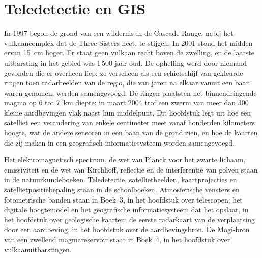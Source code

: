 \chapter{Teledetectie en GIS}\label{ch:b3:remote-sensing-gis}

In 1997 begon de grond van een wildernis in de Cascade Range, nabij het
vulkaancomplex dat de Three Sisters heet, te stijgen. In 2001 stond het midden ervan
\qty{15}{cm} hoger. Er staat geen vulkaan recht boven de zwelling, en de
laatste uitbarsting in het gebied was 1\,500 jaar oud. De opheffing werd door niemand
gevonden die er overheen liep: ze verscheen als een schietschijf van gekleurde ringen
toen radarbeelden van de regio, die van jaren na elkaar vanuit een baan waren genomen,
werden samengevoegd. De ringen plaatsten het binnendringende magma op 6 tot
\qty{7}{km} diepte; in maart 2004 trof een zwerm van meer dan 300 kleine aardbevingen
vlak naast hun middelpunt. Dit hoofdstuk legt uit hoe een satelliet een verandering van
enkele centimeter meet vanaf honderden kilometers hoogte, wat de andere sensoren in een
baan van de grond zien, en hoe de kaarten die zij maken in een
geografisch informatiesysteem worden samengevoegd.

\begin{recall}
Het elektromagnetisch spectrum, de wet van Planck voor het zwarte lichaam,
emissiviteit en de wet van Kirchhoff, reflectie en de interferentie van golven
staan in de natuurkundeboeken. Teledetectie, satellietbeelden, kaartprojecties
en satellietpositiebepaling staan in de schoolboeken. Atmosferische vensters en
fotometrische banden staan in Boek~3, in het hoofdstuk over telescopen;
het digitale hoogtemodel en het geografische informatiesysteem dat het opslaat,
in het hoofdstuk over geologische kaarten; de eerste radarkaart van de
verplaatsing door een aardbeving, in het hoofdstuk over de aardbevingsbron. De
Mogi-bron van een zwellend magmareservoir staat in Boek~4, in het hoofdstuk
over vulkaanuitbarstingen.
\end{recall}

